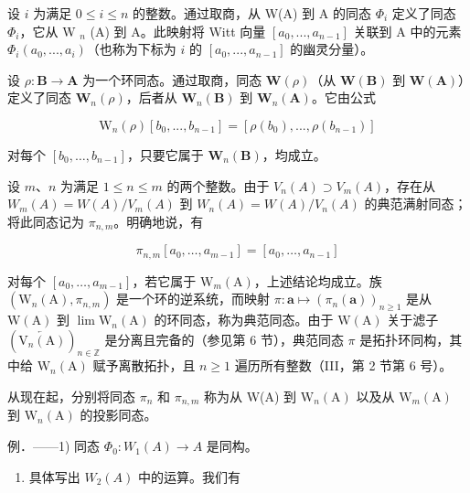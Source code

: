 设 \(i\) 为满足 \(0 \leqslant i \leqslant n\) 的整数。通过取商，从 W(A) 到 A 的同态 \(\Phi_{i}\) 定义了同态 \(\Phi_{i}\)，它从 W \(_{n}\) (A) 到 A。此映射将 Witt 向量 \([a_{0}, ..., a_{n-1}]\) 关联到 A 中的元素 \(\Phi_{i}(a_{0}, ..., a_{i})\)（也称为下标为 \(i\) 的 \([a_{0}, ..., a_{n-1}]\) 的幽灵分量）。

设 \(\rho : \mathbf{B} \to \mathbf{A}\) 为一个环同态。通过取商，同态 \(\mathbf{W}(\rho)\)（从 \(\mathbf{W}(\mathbf{B})\) 到 \(\mathbf{W}(\mathbf{A})\)）定义了同态 \(\mathbf{W}_n(\rho)\)，后者从 \(\mathbf{W}_n(\mathbf{B})\) 到 \(\mathbf{W}_n(\mathbf{A})\)。它由公式

\[
\mathrm{W} _ {n} (\rho) \left[ b _ {0},..., b _ {n - 1} \right] = \left[ \rho (b _ {0}),..., \rho (b _ {n - 1}) \right]\tag{43}
\]

对每个 \([b_0, \ldots, b_{n-1}]\)，只要它属于 \(\mathbf{W}_n(\mathbf{B})\)，均成立。

设 \(m\)、\(n\) 为满足 \(1 \leqslant n \leqslant m\) 的两个整数。由于 \(V_n(A) \supset V_m(A)\)，存在从 \(W_m(A) = W(A)/V_m(A)\) 到 \(W_n(A) = W(A)/V_n(A)\) 的典范满射同态；将此同态记为 \(\pi_{n,m}\)。明确地说，有

\[
\pi_ {n, m} [ a _ {0}, \dots , a _ {m - 1} ] = [ a _ {0}, \dots , a _ {n - 1} ]\tag{44}
\]

对每个 \([a_0, \ldots, a_{m-1}]\)，若它属于 \(\mathrm{W}_m(\mathrm{A})\)，上述结论均成立。族 \((\mathrm{W}_n(\mathrm{A}), \pi_{n,m})\) 是一个环的逆系统，而映射 \(\pi: \boldsymbol{a} \mapsto (\pi_n(\boldsymbol{a}))_{n \geqslant 1}\) 是从 \(\mathrm{W}(\mathrm{A})\) 到 \(\lim \mathrm{W}_n(\mathrm{A})\) 的环同态，称为典范同态。由于 \(\mathrm{W}(\mathrm{A})\) 关于滤子 \((\overleftarrow{\mathrm{V}_n(\mathrm{A})})_{n \in \mathbb{Z}}\) 是分离且完备的（参见第 6 节），典范同态 \(\pi\) 是拓扑环同构，其中给 \(\mathrm{W}_n(\mathrm{A})\) 赋予离散拓扑，且 \(n \geqslant 1\) 遍历所有整数（III，第 2 节第 6 号）。

从现在起，分别将同态 \(\pi_{n}\) 和 \(\pi_{n,m}\) 称为从 W(A) 到 \(\mathrm{W}_{n}(\mathrm{A})\) 以及从 \(\mathrm{W}_{m}(\mathrm{A})\) 到 \(\mathrm{W}_{n}(\mathrm{A})\) 的投影同态。

例．——1) 同态 \(\Phi_{0}:W_{1}(A)\to A\) 是同构。

\begin{enumerate}
\def\labelenumi{\arabic{enumi})}
\setcounter{enumi}{1}
\tightlist
\item
  具体写出 \(W_{2}(A)\) 中的运算。我们有
\end{enumerate}

